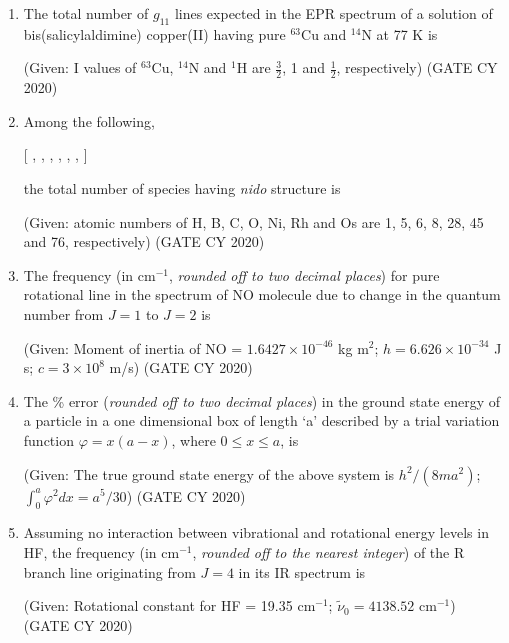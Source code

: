 \documentclass[12pt]{article}
\begin{document}
\begin{enumerate}
\item The total number of $g_{11}$ lines expected in the EPR spectrum of a solution of bis(salicylaldimine) copper(II) having pure $^{63}$Cu and $^{14}$N at 77 K is \underline{\hspace{2cm}}

(Given: I values of $^{63}$Cu, $^{14}$N and $^1$H are $\frac{3}{2}$, 1 and $\frac{1}{2}$, respectively)
\hfill (GATE CY 2020)

\item Among the following,

[ , , , , , ,  ]

the total number of species having \textit{nido} structure is \underline{\hspace{2cm}}

(Given: atomic numbers of H, B, C, O, Ni, Rh and Os are 1, 5, 6, 8, 28, 45 and 76, respectively)
\hfill (GATE CY 2020)

\item The frequency (in cm$^{-1}$, \textit{rounded off to two decimal places}) for pure rotational line in the spectrum of NO molecule due to change in the quantum number from $J=1$ to $J=2$ is \underline{\hspace{2cm}}

(Given: Moment of inertia of NO = $1.6427 \times 10^{-46}$ kg m$^{2}$; $h = 6.626 \times 10^{-34}$ J s; $c = 3 \times 10^8$ m/s)
\hfill (GATE CY 2020)

\item The \% error (\textit{rounded off to two decimal places}) in the ground state energy of a particle in a one dimensional box of length `a' described by a trial variation function $\varphi = x(a-x)$, where $0 \leq x \leq a$, is \underline{\hspace{2cm}}

(Given: The true ground state energy of the above system is $h^2/(8ma^2)$; $\int_{0}^{a} \varphi^2 dx = a^5/30$)
\hfill (GATE CY 2020)

\item Assuming no interaction between vibrational and rotational energy levels in HF, the frequency (in cm$^{-1}$, \textit{rounded off to the nearest integer}) of the R branch line originating from $J=4$ in its IR spectrum is \underline{\hspace{2cm}}

(Given: Rotational constant for HF = 19.35 cm$^{-1}$; $\tilde{\nu}_0 = 4138.52$ cm$^{-1}$)
\hfill (GATE CY 2020)


\end{enumerate}
\end{document}
